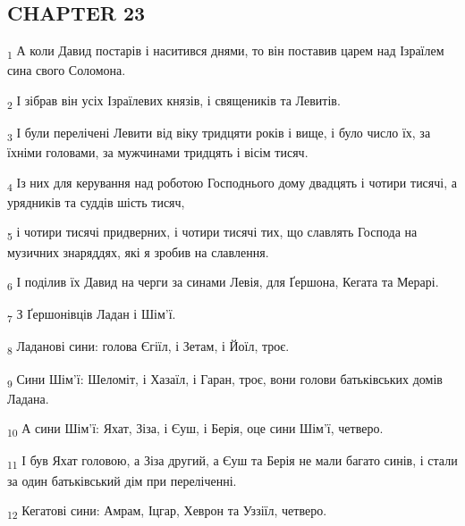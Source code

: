 \subsection{CHAPTER 23}
\begin{tcolorbox}
\textsubscript{1} А коли Давид постарів і наситився днями, то він поставив царем над Ізраїлем сина свого Соломона.
\end{tcolorbox}
\begin{tcolorbox}
\textsubscript{2} І зібрав він усіх Ізраїлевих князів, і священиків та Левитів.
\end{tcolorbox}
\begin{tcolorbox}
\textsubscript{3} І були перелічені Левити від віку тридцяти років і вище, і було число їх, за їхніми головами, за мужчинами тридцять і вісім тисяч.
\end{tcolorbox}
\begin{tcolorbox}
\textsubscript{4} Із них для керування над роботою Господнього дому двадцять і чотири тисячі, а урядників та суддів шість тисяч,
\end{tcolorbox}
\begin{tcolorbox}
\textsubscript{5} і чотири тисячі придверних, і чотири тисячі тих, що славлять Господа на музичних знаряддях, які я зробив на славлення.
\end{tcolorbox}
\begin{tcolorbox}
\textsubscript{6} І поділив їх Давид на черги за синами Левія, для Ґершона, Кегата та Мерарі.
\end{tcolorbox}
\begin{tcolorbox}
\textsubscript{7} З Ґершонівців Ладан і Шім'ї.
\end{tcolorbox}
\begin{tcolorbox}
\textsubscript{8} Ладанові сини: голова Єгіїл, і Зетам, і Йоїл, троє.
\end{tcolorbox}
\begin{tcolorbox}
\textsubscript{9} Сини Шім'ї: Шеломіт, і Хазаїл, і Гаран, троє, вони голови батьківських домів Ладана.
\end{tcolorbox}
\begin{tcolorbox}
\textsubscript{10} А сини Шім'ї: Яхат, Зіза, і Єуш, і Берія, оце сини Шім'ї, четверо.
\end{tcolorbox}
\begin{tcolorbox}
\textsubscript{11} І був Яхат головою, а Зіза другий, а Єуш та Берія не мали багато синів, і стали за один батьківський дім при переліченні.
\end{tcolorbox}
\begin{tcolorbox}
\textsubscript{12} Кегатові сини: Амрам, Іцгар, Хеврон та Уззіїл, четверо.
\end{tcolorbox}
